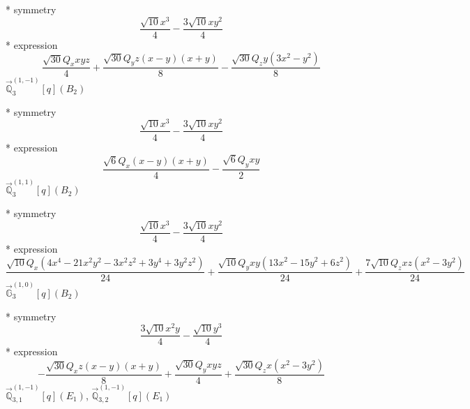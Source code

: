 \documentclass[fleqn,8pt]{jsarticle}
\begin{document}
\noindent\quad ** symmetry
\begin{dmath*}
\frac{\sqrt{10} x^{3}}{4} - \frac{3 \sqrt{10} x y^{2}}{4}
\end{dmath*}
\noindent\quad ** expression
\begin{dmath*}
\frac{\sqrt{30} Q_{x} x y z}{4} + \frac{\sqrt{30} Q_{y} z \left(x - y\right) \left(x + y\right)}{8} - \frac{\sqrt{30} Q_{z} y \left(3 x^{2} - y^{2}\right)}{8}
\end{dmath*}
\noindent\quad $\vec{\mathbb{Q}}_{3}^{(1,-1)}[q](B_{2})$

\noindent\quad ** symmetry
\begin{dmath*}
\frac{\sqrt{10} x^{3}}{4} - \frac{3 \sqrt{10} x y^{2}}{4}
\end{dmath*}
\noindent\quad ** expression
\begin{dmath*}
\frac{\sqrt{6} Q_{x} \left(x - y\right) \left(x + y\right)}{4} - \frac{\sqrt{6} Q_{y} x y}{2}
\end{dmath*}
\noindent\quad $\vec{\mathbb{Q}}_{3}^{(1,1)}[q](B_{2})$

\noindent\quad ** symmetry
\begin{dmath*}
\frac{\sqrt{10} x^{3}}{4} - \frac{3 \sqrt{10} x y^{2}}{4}
\end{dmath*}
\noindent\quad ** expression
\begin{dmath*}
\frac{\sqrt{10} Q_{x} \left(4 x^{4} - 21 x^{2} y^{2} - 3 x^{2} z^{2} + 3 y^{4} + 3 y^{2} z^{2}\right)}{24} + \frac{\sqrt{10} Q_{y} x y \left(13 x^{2} - 15 y^{2} + 6 z^{2}\right)}{24} + \frac{7 \sqrt{10} Q_{z} x z \left(x^{2} - 3 y^{2}\right)}{24}
\end{dmath*}
\noindent\quad $\vec{\mathbb{G}}_{3}^{(1,0)}[q](B_{2})$

\noindent\quad ** symmetry
\begin{dmath*}
\frac{3 \sqrt{10} x^{2} y}{4} - \frac{\sqrt{10} y^{3}}{4}
\end{dmath*}
\noindent\quad ** expression
\begin{dmath*}
- \frac{\sqrt{30} Q_{x} z \left(x - y\right) \left(x + y\right)}{8} + \frac{\sqrt{30} Q_{y} x y z}{4} + \frac{\sqrt{30} Q_{z} x \left(x^{2} - 3 y^{2}\right)}{8}
\end{dmath*}
\noindent\quad $\vec{\mathbb{Q}}_{3,1}^{(1,-1)}[q](E_{1})$, $\vec{\mathbb{Q}}_{3,2}^{(1,-1)}[q](E_{1})$
\end{document}
